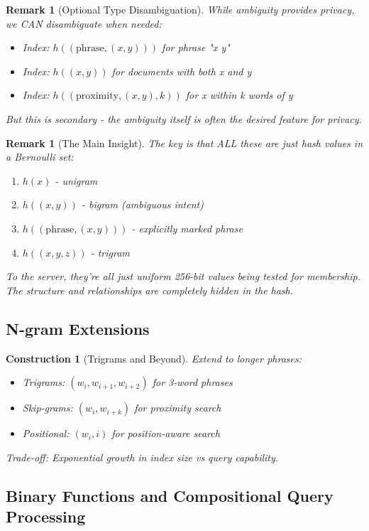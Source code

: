 \documentclass[11pt,final]{article}
\newtheorem{remark}[theorem]{Remark}
\newtheorem{construction}[theorem]{Construction}
\begin{document}
\begin{remark}[Optional Type Disambiguation]
While ambiguity provides privacy, we CAN disambiguate when needed:
\begin{itemize}
    \item Index: $h((\text{phrase}, (x, y)))$ for phrase "x y"
    \item Index: $h((x, y))$ for documents with both x and y
    \item Index: $h((\text{proximity}, (x, y), k))$ for x within k words of y
\end{itemize}
But this is secondary - the ambiguity itself is often the desired feature for privacy.
\end{remark}

\begin{remark}[The Main Insight]
The key is that ALL these are just hash values in a Bernoulli set:
\begin{enumerate}
    \item $h(x)$ - unigram
    \item $h((x,y))$ - bigram (ambiguous intent)
    \item $h((\text{phrase}, (x,y)))$ - explicitly marked phrase
    \item $h((x,y,z))$ - trigram
\end{enumerate}
To the server, they're all just uniform 256-bit values being tested for membership. The structure and relationships are completely hidden in the hash.
\end{remark}

\subsection{N-gram Extensions}

\begin{construction}[Trigrams and Beyond]
Extend to longer phrases:
\begin{itemize}
    \item Trigrams: $(w_i, w_{i+1}, w_{i+2})$ for 3-word phrases
    \item Skip-grams: $(w_i, w_{i+k})$ for proximity search
    \item Positional: $(w_i, i)$ for position-aware search
\end{itemize}
Trade-off: Exponential growth in index size vs query capability.
\end{construction}

\subsection{Binary Functions and Compositional Query Processing}
\end{document}
